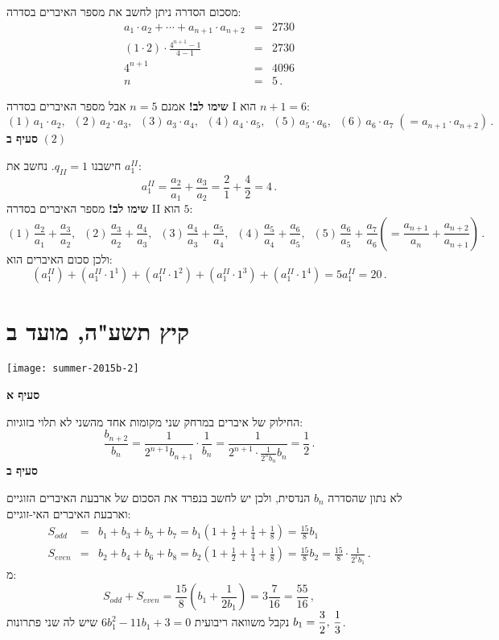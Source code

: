 מסכום הסדרה ניתן לחשב את מספר האיברים בסדרה:
\begin{eqnarray*}
a_1\cdot a_2 + \cdots + a_{n+1} \cdot a_{n+2} &=& 2730\\
(1\cdot 2)\cdot \frac{4^{n+1}-1}{4-1}&=&2730\\
4^{n+1}&=&4096\\
n&=&5\,.
\end{eqnarray*}

\np

\textbf{שימו לב!}
אמנם
$n=5$
אבל מספר האיברים בסדרה I הוא 
$n+1=6$:
\[
(1)\, a_1\cdot a_2,\;\; (2)\,a_2\cdot a_3,\;\;(3)\, a_3\cdot a_4,\;\; (4)\,a_4\cdot a_5,\;\; (5)\,a_5\cdot a_6,\;\; (6)\,a_6\cdot a_7 \;(= a_{n+1}\cdot a_{n+2})\,.
\]
\textbf{סעיף ב}
$(2)$

חישבנו
$q_{II}=1$.
נחשב את
$a_1^{II}$:
\[
a_1^{II}=\frac{a_{2}}{a_1} + \frac{a_{3}}{a_{2}}=\frac{2}{1}+\frac{4}{2}=4\,.
\]
\textbf{שימו לב!}
מספר האיברים בסדרה II הוא 
$5$:
\[
(1)\,\frac{a_2}{a_1}+\frac{a_3}{a_2},\;\;
(2)\,\frac{a_3}{a_2}+\frac{a_4}{a_3},\;\;
(3)\,\frac{a_4}{a_3}+\frac{a_5}{a_4},\;\;
(4)\,\frac{a_5}{a_4}+\frac{a_6}{a_5},\;\;
(5)\,\frac{a_6}{a_5}+\frac{a_7}{a_6} \left(= \frac{a_{n+1}}{a_n}+\frac{a_{n+2}}{a_{n+1}}\right)\,.
\]
ולכן סכום האיברים הוא:
\[
(a_1^{II})+(a_1^{II}\cdot 1^1) + (a_1^{II}\cdot 1^2) + (a_1^{II}\cdot 1^3) + (a_1^{II}\cdot 1^4) =  5a_1^{II}=20\,.
\]


\np

\section{קיץ תשע"ה, מועד ב}

\begin{center}
\texttt{[image: summer-2015b-2]}
\end{center}
\vspace{-2ex}

\textbf{סעיף א}

החילוק של איברים במרחק שני מקומות אחד מהשני לא תלוי בזוגיות:
\[
\frac{b_{n+2}}{b_n} = \frac{1}{2^{n+1}b_{n+1}}\cdot\frac{1}{b_n}=\frac{1}{2^{n+1}\cdot\displaystyle\frac{1}{2^nb_n}{b_n}}= \frac{1}{2}\,.
\]
\textbf{סעיף ב}

לא נתון שהסדרה 
$b_n$
הנדסית, ולכן יש לחשב בנפרד את הסכום של ארבעת האיברים הזוגיים וארבעת האיברים האי-זוגיים:
\begin{eqnarray*}
S_{\mathit{odd}} &=& b_1+b_3+b_5+b_7=b_1\left(1 + \frac{1}{2} + \frac{1}{4} +\frac{1}{8}\right)=\frac{15}{8}b_1\\
S_{\mathit{even}} &=& b_2+b_4+b_6+b_8=b_2\left(1 + \frac{1}{2} + \frac{1}{4} +\frac{1}{8}\right)=\frac{15}{8}b_2=\frac{15}{8}\cdot\frac{1}{2^1b_1}\,.
\end{eqnarray*}
מ:
\[
S_{\mathit{odd}} + S_{\mathit{even}} =\frac{15}{8}\left(b_1+\frac{1}{2b_1}\right)= 3\frac{7}{16}=\frac{55}{16}\,,
\]
נקבל משוואה ריבועית 
$6b_1^2-11b_1+3=0$
שיש לה שני פתרונות 
$b_1=\displaystyle\frac{3}{2},\,\displaystyle\frac{1}{3}$.


